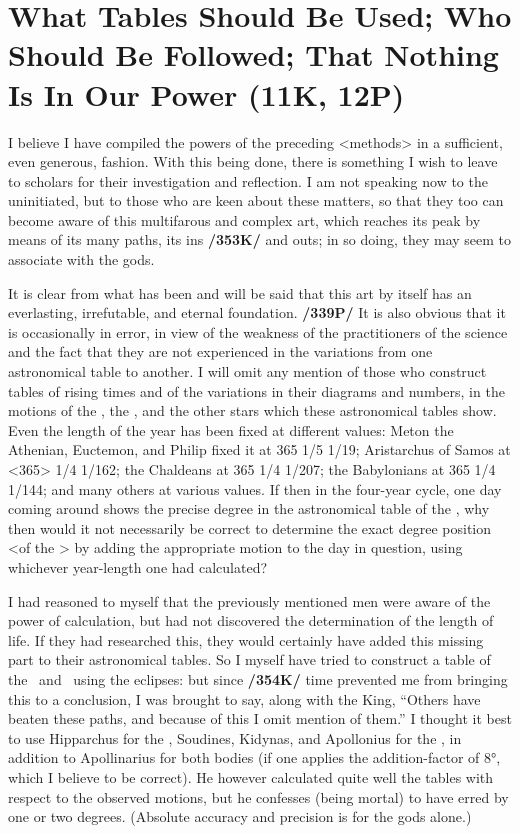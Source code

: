 \section{What Tables Should Be Used; Who Should Be Followed; That Nothing Is In Our Power (11K, 12P)}

I believe I have compiled the powers of the preceding <methods> in a sufficient, even generous, fashion. With this being done, there is something I wish to leave to scholars for their investigation and reflection. I am not speaking now to the uninitiated, but to those who are keen about these matters, so that they too can become aware of this multifarous and complex art, which reaches its peak by means of its many paths, its ins \textbf{/353K/} and outs; in so doing, they may seem to associate with the gods. 

It is clear from what has been and will be said that this art by itself has an everlasting, irrefutable, and eternal foundation. \textbf{/339P/} It is also obvious that it is occasionally in error, in view of the weakness of the practitioners of the science and the fact that they are not experienced in the variations from one astronomical table to another. I will omit any mention of those who construct tables of rising times and of the variations in their diagrams and numbers, in the motions of the \Sun, the \Moon, and the other stars which these astronomical tables show. Even the length of the year has been fixed at different values: Meton the Athenian, Euctemon, and Philip fixed it at 365 1/5 1/19; Aristarchus of Samos at <365> 1/4 1/162; the Chaldeans at 365 1/4 1/207; the Babylonians at 365 1/4 1/144; and many others at various values. If then in the four-year cycle, one day coming around shows the precise degree in the astronomical table of the \Sun, why then would it not necessarily be correct to determine the exact degree position <of the \Sun> by adding the appropriate motion to the day in question, using whichever year-length one had calculated?

I had reasoned to myself that the previously mentioned men were aware of the power of calculation, but had not discovered the determination of the length of life. If they had researched this, they would certainly have added this missing part to their astronomical tables. So I myself have tried to construct a table of the \Sun\, and \Moon\, using the eclipses: but since \textbf{/354K/} time prevented me from bringing this to a conclusion, I was brought to say, along with the King, “Others have beaten these paths, and because of this I omit mention of them.” I thought it best to use Hipparchus for the \Sun, Soudines, Kidynas, and Apollonius for the \Moon, in addition to Apollinarius for both bodies (if one applies the addition-factor of 8°, which I believe to be correct). He however calculated quite well the tables with respect to the observed motions, but he confesses (being mortal) to have erred by one or two degrees. (Absolute accuracy and precision is for
the gods alone.) 

